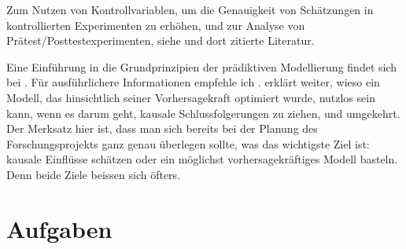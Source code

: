 \documentclass[oneside, 10pt]{book}\usepackage[]{graphicx}\usepackage[]{xcolor}
\begin{document}
Zum Nutzen von Kontrollvariablen, um die Genauigkeit von Schätzungen
in kontrollierten Experimenten zu erhöhen, und zur Analyse von
Prätest/Posttestexperimenten, siehe \citet{Vanhove2015} und
dort zitierte Literatur.

Eine Einführung in die Grundprinzipien der prädiktiven
Modellierung findet sich bei \citet{Yarkoni2017}.
Für ausführlichere Informationen empfehle ich \citet{Kuhn2013}.
\citet{Shmueli2010} erklärt weiter, wieso ein Modell,
das hinsichtlich seiner Vorhersagekraft optimiert wurde,
nutzlos sein kann, wenn es darum geht, kausale Schlussfolgerungen
zu ziehen, und umgekehrt. Der Merksatz hier ist, dass man sich
bereits bei der Planung des Forschungsprojekts ganz genau
überlegen sollte, was das wichtigste Ziel ist: kausale Einflüsse
schätzen oder ein möglichst vorhersagekräftiges Modell basteln.
Denn beide Ziele beissen sich öfters.

\section{Aufgaben}
\end{document}
